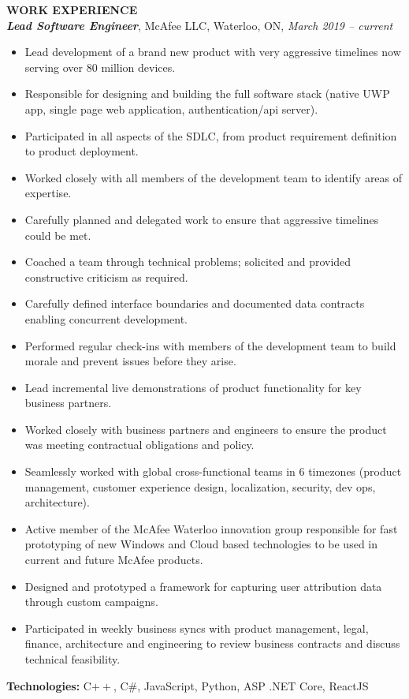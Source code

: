 \documentclass[10pt,letterpaper]{article}
\newcommand{\job}[4]
{
    \emph{\textbf{#1}}, #2, #3, \emph{#4}
}
\begin{document}
\vspace{0.5em}
\textbf{WORK EXPERIENCE} \hrulefill \\[0.5em]
\job{Lead Software Engineer}{McAfee LLC}{Waterloo, ON}{March 2019 -- current}
\begin{adjustwidth}{0.1in}{0.5in}
    \begin{itemize}    
    \item Lead development of a brand new product with very aggressive timelines now serving over 80 million devices.
    \item Responsible for designing and building the full software stack (native UWP app, single page web application, authentication/api server).
    \item Participated in all aspects of the SDLC, from product requirement definition to product deployment. 
    \item Worked closely with all members of the development team to identify areas of expertise. 
    \item Carefully planned and delegated work to ensure that aggressive timelines could be met.
    \item Coached a team through technical problems; solicited and provided constructive criticism as required.
    \item Carefully defined interface boundaries and documented data contracts enabling concurrent development.
    \item Performed regular check-ins with members of the development team to build morale and prevent issues before they arise.
    \item Lead incremental live demonstrations of product functionality for key business partners.
    \item Worked closely with business partners and engineers to ensure the product was meeting contractual obligations and policy.
    \item Seamlessly worked with global cross-functional teams in 6 timezones (product management, customer experience design, localization, security, dev ops, architecture).
    \item Active member of the McAfee Waterloo innovation group responsible for fast prototyping of new Windows and Cloud based technologies to be used in current and future McAfee products.
    \item Designed and prototyped a framework for capturing user attribution data through custom campaigns. 
    \item Participated in weekly business syncs with product management, legal, finance, architecture and engineering to review business contracts and discuss technical feasibility.
    \end{itemize}
    \vspace{0.5em}
    \textbf{Technologies:} C$++$, C\#, JavaScript, Python, ASP .NET Core, ReactJS 
\end{adjustwidth}
\newpage
\end{document}
